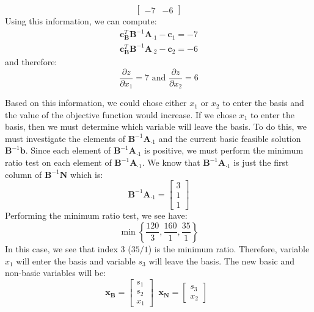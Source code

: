 \begin{example}
\begin{displaymath}
\begin{bmatrix}-7 & -6\end{bmatrix}
\end{displaymath}
Using this information, we can compute: 
\begin{gather*}
\mathbf{c}_\mathbf{B}^T\mathbf{B}^{-1}\mathbf{A}_{\cdot 1}-\mathbf{c}_1 = -7\\
\mathbf{c}_\mathbf{B}^T\mathbf{B}^{-1}\mathbf{A}_{\cdot 2}-\mathbf{c}_2 = -6
\end{gather*}
and therefore:
\begin{displaymath}
\frac{\partial z}{\partial x_1} = 7\text{ and } \frac{\partial z}{\partial x_2} = 6
\end{displaymath}

Based on this information, we could chose either $x_1$ or $x_2$ to enter the basis and the value of the objective function would increase. If we chose $x_1$ to enter the basis, then we must determine which variable will leave the basis. To do this, we must investigate the elements of 
$\mathbf{B}^{-1}\mathbf{A}_{\cdot 1}$ and the current basic feasible solution $\mathbf{B}^{-1}\mathbf{b}$. Since each element of $\mathbf{B}^{-1}\mathbf{A}_{\cdot 1}$ is positive, we must perform the minimum ratio test on each element of $\mathbf{B}^{-1}\mathbf{A}_{\cdot 1}$. We know that $\mathbf{B}^{-1}\mathbf{A}_{\cdot 1}$ is just the first column of $\mathbf{B}^{-1}\mathbf{N}$ which is:
\begin{displaymath}
\mathbf{B}^{-1}\mathbf{A}_{\cdot 1} = \begin{bmatrix}
3\\
1\\
1
\end{bmatrix}
\end{displaymath}
Performing the minimum ratio test, we see have:
\begin{displaymath}
\min\left\{\frac{120}{3},\frac{160}{1},\frac{35}{1}\right\}
\end{displaymath}
In this case, we see that index 3 ($35/1$) is the minimum ratio. Therefore, variable $x_1$ will enter the basis and variable $s_3$ will leave the basis. The new basic and non-basic variables will be:
\begin{displaymath}
\mathbf{x_B} = \begin{bmatrix}s_1\\s_2\\x_1\end{bmatrix}\;\;
\mathbf{x_N} = \begin{bmatrix}s_3\\x_2\end{bmatrix}\;\;

\end{displaymath}
\end{example}

